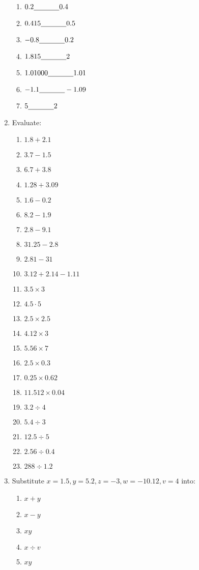 \documentclass{article}
\newcommand{\blk}{\underline{\hspace{0.5in}}}
\begin{document}
\begin{multicols}{2}
\begin{enumerate}
	\begin{enumerate}
		\item $0.2 \blk{} 0.4$
		\item $0.415 \blk 0.5$
		\item $-0.8 \blk 0.2$
		\item $1.815 \blk 2$
		\item $1.01000 \blk 1.01$
		\item $-1.1 \blk -1.09$
		\item $5 \blk 2$
	\end{enumerate}
	\item Evaluate:
	\begin{enumerate}
		\item $1.8 + 2.1$
		\item $3.7 - 1.5$
		\item $6.7 + 3.8$
		\item $1.28+3.09$
		\item $1.6-0.2$
		\item $8.2 - 1.9$
		\item $2.8 - 9.1$
		\item $31.25 - 2.8$
		\item $2.81 - 31$
		\item $3.12+2.14-1.11$
		\item $3.5 \times 3$
		\item $4.5 \cdot 5$
		\item $2.5 \times 2.5$
		\item $4.12 \times 3$
		\item $5.56 \times 7$
		\item $2.5 \times 0.3$
		\item $0.25 \times 0.62$
		\item $11.512 \times 0.04$
		\item $3.2 \div 4$
		\item $5.4 \div 3$
		\item $12.5 \div 5$
		\item $2.56 \div 0.4$
		\item $288 \div 1.2$
	\end{enumerate}
	\item Substitute $x=1.5, y=5.2, z=-3, w=-10.12, v=4$ into:
	\begin{enumerate}
		\item $x+y$
		\item $x-y$
		\item $xy$
		\item $x \div v$
		\item $xy$

\end{enumerate}
\end{enumerate}
\end{multicols}
\end{document}
